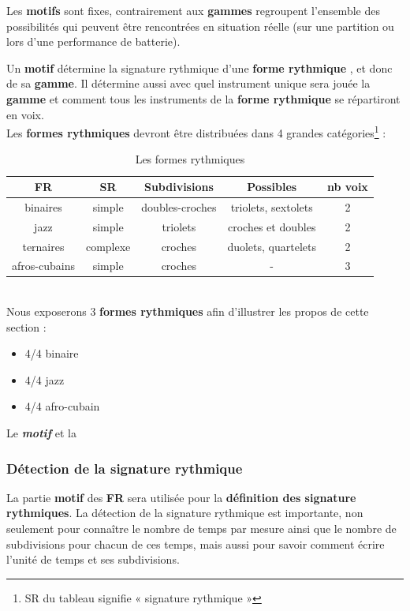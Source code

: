 Les \textbf{motifs} sont fixes, contrairement aux \textbf{gammes} regroupent
l’ensemble des possibilités qui peuvent être rencontrées en situation réelle
(sur une partition ou lors d’une performance de batterie).

Un \textbf{motif} détermine la signature rythmique d’une
\textbf{forme rythmique} , et donc de sa \textbf{gamme}. Il détermine aussi
avec quel instrument unique sera jouée la \textbf{gamme} et comment tous les
instruments de la \textbf{forme rythmique} se répartiront en voix.\\




Les \textbf{formes rythmiques} devront être distribuées dans 4 grandes
catégories\footnote{SR du tableau signifie « signature rythmique »}
\cite{system_drums} :
\begin{table}[h]
\centering
\begin{tabular}{|c|c|c|c|c|} \hline
\textbf{FR} & SR & Subdivisions & Possibles & nb
voix \\ \hline
binaires & simple & doubles-croches & triolets, sextolets & 2 \\
jazz & simple & triolets & croches et doubles & 2 \\
ternaires & complexe & croches & duolets, quartelets & 2 \\
afros-cubains & simple & croches & - & 3 \\ \hline
\end{tabular}
\caption{Les formes rythmiques}
\end{table}\\
Nous exposerons 3 \textbf{formes rythmiques} afin d’illustrer les propos de
cette section :
\begin{itemize}
	\item 4/4 binaire 
	\item 4/4 jazz
	\item 4/4 afro-cubain
\end{itemize}

Le \textit{\textbf{motif}} et la

\subsubsection{Détection de la signature rythmique}
La partie \textbf{motif} des \textbf{FR} sera utilisée pour la
\textbf{définition des signature rythmiques}. 
La détection de la signature rythmique est importante, 
non seulement pour connaître le nombre de temps par mesure ainsi que le nombre
de subdivisions pour chacun de ces temps, mais aussi pour savoir comment écrire
l’unité de temps et ses subdivisions.

